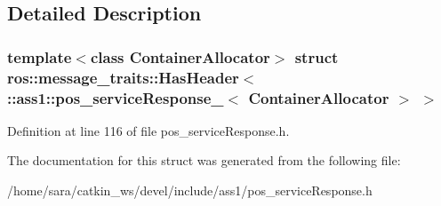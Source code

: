 \subsection{Detailed Description}
\subsubsection*{template$<$class Container\+Allocator$>$\newline
struct ros\+::message\+\_\+traits\+::\+Has\+Header$<$ \+::ass1\+::pos\+\_\+service\+Response\+\_\+$<$ Container\+Allocator $>$ $>$}



Definition at line 116 of file pos\+\_\+service\+Response.\+h.



The documentation for this struct was generated from the following file\+:\begin{DoxyCompactItemize}
\item 
/home/sara/catkin\+\_\+ws/devel/include/ass1/pos\+\_\+service\+Response.\+h\end{DoxyCompactItemize}
